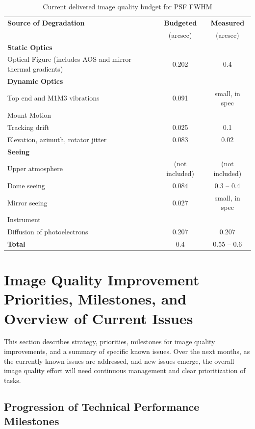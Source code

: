 \documentclass[SO,lsst,authoryear,toc]{lsstdoc}
\begin{document}
\begin{table}
\centering
\caption{Current delivered image quality budget for PSF FWHM}
\label{tab:diq_budget}
\begin{tabular}{lcc}
\hline
\textbf{Source of Degradation} &  \textbf{Budgeted} & \textbf{Measured} \\
 & (arcsec) & (arcsec) \\
\hline
\textbf{Static Optics} & & \\
Optical Figure (includes AOS and mirror thermal gradients) & 0.202 & 0.4 \\
\textbf{Dynamic Optics} & & \\
Top end and M1M3 vibrations & 0.091 & small, in spec \\
Mount Motion & & \\
Tracking drift & 0.025 & 0.1 \\
Elevation, azimuth, rotator jitter & 0.083 & 0.02 \\
\textbf{Seeing} & & \\
Upper atmosphere & (not included) & (not included) \\
Dome seeing & 0.084 & 0.3 -- 0.4 \\
Mirror seeing & 0.027 & small, in spec \\
Instrument & & \\
Diffusion of photoelectrons & 0.207 & 0.207 \\
\textbf{Total} & 0.4 & 0.55 -- 0.6 \\
\hline
\end{tabular}
\end{table}

\section{Image Quality Improvement Priorities, Milestones, and Overview of Current Issues}

This section describes strategy, priorities, milestones for image quality improvements, and a summary of specific known issues.
Over the next months, as the currently known issues are addressed, and new issues emerge, the overall image quality effort will need continuous management and clear prioritization of tasks.

\subsection{Progression of Technical Performance Milestones}
\end{document}
